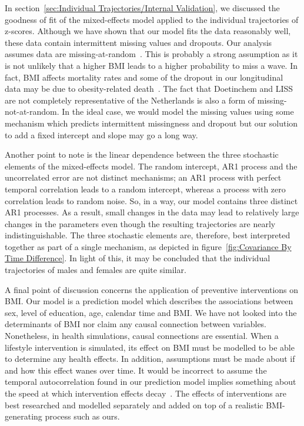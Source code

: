 \documentclass{imammb}
\numberwithin{equation}{section}
\begin{document}
In section~\ref{sec:Individual Trajectories/Internal Validation}, we discussed the goodness of fit of the mixed-effects model applied to the \mbox{individual} trajectories of z-scores. Although we have shown that our model fits the data reasonably well, these data contain intermittent missing values and dropouts. Our analysis assumes data are missing-at-random~\citep{Diggle1994, Verbeke2000}. This is probably a strong assumption as it is not unlikely that a higher BMI leads to a higher probability to miss a wave. In fact, BMI \mbox{affects} mortality rates and some of the dropout in our longitudinal data may be due to obesity-related death~\citep{Hoogenveen2000}. The fact that Doetinchem and LISS are not completely representative of the Netherlands is also a form of missing-not-at-random. In the ideal case, we would model the missing values using some mechanism which predicts intermittent missingness and dropout but our solution to add a fixed intercept and slope may go a long way.

Another point to note is the linear dependence between the three stochastic elements of the mixed-effects model. The random intercept, AR1 process and the uncorrelated error are not distinct mechanisms; an AR1 process with perfect temporal correlation leads to a random intercept, whereas a process with zero correlation leads to random noise. So, in a way, our model contains three distinct AR1 processes. As a result, small changes in the data may lead to relatively large changes in the parameters even though the resulting trajectories are nearly indistinguishable. The three stochastic elements are, therefore, best interpreted together as part of a single mechanism, as depicted in figure~\ref{fig:Covariance By Time Difference}. In light of this, it may be concluded that the individual trajectories of males and females are quite similar.

A final point of discussion concerns the application of preventive interventions on BMI. Our model is a prediction model which describes the associations between sex, level of education, age, calendar time and BMI. We have not looked into the determinants of BMI nor claim any causal connection between variables. Nonetheless, in health simulations, causal connections are essential. When a lifestyle intervention is simulated, its effect on BMI must be modelled to be able to determine any health effects. In addition, assumptions must be made about if and how this effect wanes over time. It would be incorrect to assume the temporal autocorrelation found in our prediction model implies something about the speed at which intervention effects decay~\citep{Bayer2011}. The effects of interventions are best researched and modelled separately and added on top of a realistic BMI-generating process such as ours.
\end{document}
